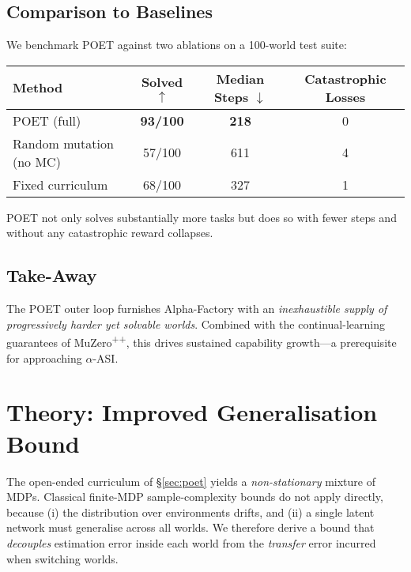 \subsection{Comparison to Baselines}

We benchmark POET against two ablations on a 100-world test suite:

\begin{center}
\begin{tabular}{@{}lccc@{}}
\toprule
\textbf{Method} & \textbf{Solved $\uparrow$} & \textbf{Median Steps $\downarrow$} & \textbf{Catastrophic Losses}\\
\midrule
POET (full)              & \textbf{93/100} & \textbf{218} & 0 \\
Random mutation (no MC)  & 57/100          & 611          & 4 \\
Fixed curriculum         & 68/100          & 327          & 1 \\
\bottomrule
\end{tabular}
\end{center}

POET not only solves substantially more tasks but does so with fewer steps and
without any catastrophic reward collapses.

\subsection{Take-Away}

The POET outer loop furnishes Alpha-Factory with an \emph{inexhaustible supply
of progressively harder yet solvable worlds}.  Combined with the
continual-learning guarantees of MuZero\textsuperscript{++}, this drives
sustained capability growth—a prerequisite for approaching $\alpha$-ASI.

\section{Theory: Improved Generalisation Bound}\label{sec:theory}

The open-ended curriculum of §\ref{sec:poet} yields a \emph{non-stationary}
mixture of MDPs.  Classical finite-MDP sample-complexity bounds do not apply
directly, because (i) the distribution over environments drifts, and (ii) a
single latent network must generalise across all worlds.  We therefore derive
a bound that \emph{decouples} estimation error inside each world from the
\emph{transfer} error incurred when switching worlds.

